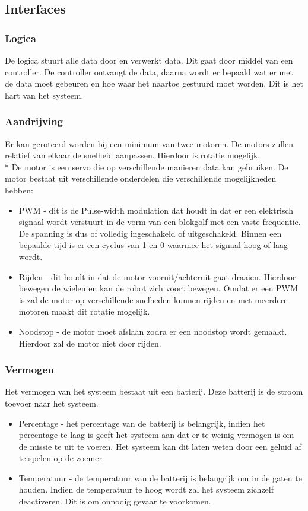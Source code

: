 \documentclass[12pt]{article} %
\begin{document}
\subsection{Interfaces}
\subsubsection{Logica}
De logica stuurt alle data door en verwerkt data. Dit gaat door middel van een controller. De controller ontvangt de data, daarna wordt er bepaald wat er met de data moet gebeuren en hoe waar het naartoe gestuurd moet worden. Dit is het hart van het systeem.

\subsubsection{Aandrijving}
Er kan geroteerd worden bij een minimum van twee motoren. De motors zullen relatief van elkaar de snelheid aanpassen. Hierdoor is rotatie mogelijk.	\\*
De motor is een servo die op verschillende manieren data kan gebruiken. De motor bestaat uit verschillende onderdelen die verschillende mogelijkheden hebben:
\begin{itemize}
\item PWM - dit is de Pulse-width modulation dat houdt in dat er een elektrisch signaal wordt verstuurt in de vorm van een blokgolf met een vaste frequentie. De spanning is dus of volledig ingeschakeld of uitgeschakeld. Binnen een bepaalde tijd is er een cyclus van 1 en 0 waarmee het signaal hoog of laag wordt.
\item Rijden - dit houdt in dat de motor vooruit/achteruit gaat draaien. Hierdoor bewegen de wielen en kan de robot zich voort bewegen. Omdat er een PWM is zal de motor op verschillende snelheden kunnen rijden en met meerdere motoren maakt dit rotatie mogelijk.
\item Noodstop - de motor moet afslaan zodra er een noodstop wordt gemaakt. Hierdoor zal de motor niet door rijden.
\end{itemize}

\subsubsection{Vermogen}
Het vermogen van het systeem bestaat uit een batterij. Deze batterij is de stroom toevoer naar het systeem.
\begin{itemize}
\item Percentage - het percentage van de batterij is belangrijk, indien het percentage te laag is geeft het systeem aan dat er te weinig vermogen is om de missie te uit te voeren. Het systeem kan dit laten weten door een geluid af te spelen op de zoemer
\item Temperatuur - de temperatuur van de batterij is belangrijk om in de gaten te houden. Indien de temperatuur te hoog wordt zal het systeem zichzelf deactiveren. Dit is om onnodig gevaar te voorkomen.
\end{itemize}
\end{document}
